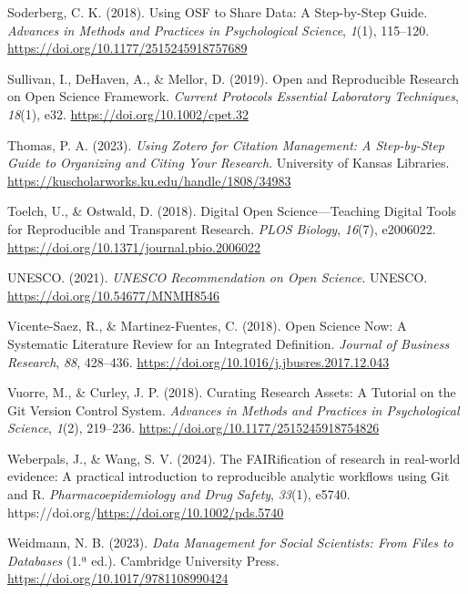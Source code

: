 \documentclass[
  a4paper,
]{book}
\newlength{\cslhangindent}
\newenvironment{CSLReferences}[2] %
 {\begin{list}{}{%
  \setlength{\itemindent}{0pt}
  \setlength{\leftmargin}{0pt}
  \setlength{\parsep}{0pt}
  \ifodd #1
   \setlength{\leftmargin}{\cslhangindent}
   \setlength{\itemindent}{-1\cslhangindent}
  \fi
  \setlength{\itemsep}{#2\baselineskip}}}
 {\end{list}}
\begin{document}
\begin{CSLReferences}{1}{0}
Soderberg, C. K. (2018). Using OSF to Share Data: A Step-by-Step Guide.
\emph{Advances in Methods and Practices in Psychological Science},
\emph{1}(1), 115--120. \url{https://doi.org/10.1177/2515245918757689}

Sullivan, I., DeHaven, A., \& Mellor, D. (2019). Open and Reproducible
Research on Open Science Framework. \emph{Current Protocols Essential
Laboratory Techniques}, \emph{18}(1), e32.
\url{https://doi.org/10.1002/cpet.32}

Thomas, P. A. (2023). \emph{Using Zotero for Citation Management: A
Step-by-Step Guide to Organizing and Citing Your Research}. University
of Kansas Libraries.
\url{https://kuscholarworks.ku.edu/handle/1808/34983}

Toelch, U., \& Ostwald, D. (2018). Digital Open Science---{Teaching}
Digital Tools for Reproducible and Transparent Research. \emph{PLOS
Biology}, \emph{16}(7), e2006022.
\url{https://doi.org/10.1371/journal.pbio.2006022}

UNESCO. (2021). \emph{{UNESCO Recommendation} on {Open Science}}.
UNESCO. \url{https://doi.org/10.54677/MNMH8546}

Vicente-Saez, R., \& Martinez-Fuentes, C. (2018). Open {Science} Now:
{A} Systematic Literature Review for an Integrated Definition.
\emph{Journal of Business Research}, \emph{88}, 428--436.
\url{https://doi.org/10.1016/j.jbusres.2017.12.043}

Vuorre, M., \& Curley, J. P. (2018). Curating {Research Assets}: {A
Tutorial} on the {Git Version Control System}. \emph{Advances in Methods
and Practices in Psychological Science}, \emph{1}(2), 219--236.
\url{https://doi.org/10.1177/2515245918754826}

Weberpals, J., \& Wang, S. V. (2024). The FAIRification of research in
real{-}world evidence: A practical introduction to reproducible analytic
workflows using Git and R. \emph{Pharmacoepidemiology and Drug Safety},
\emph{33}(1), e5740.
https://doi.org/\url{https://doi.org/10.1002/pds.5740}

Weidmann, N. B. (2023). \emph{Data Management for Social Scientists:
From Files to Databases} (1.ª ed.). Cambridge University Press.
\url{https://doi.org/10.1017/9781108990424}


\end{CSLReferences}
\end{document}
